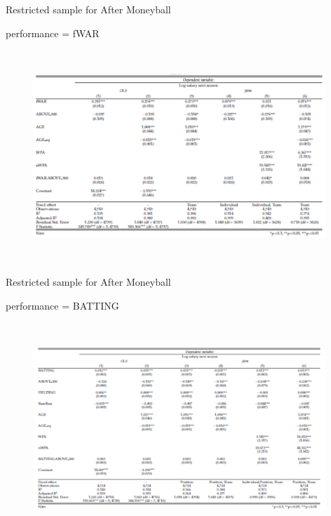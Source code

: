 \documentclass[dvipdfmx,12pt]{beamer}
\begin{document}
\begin{frame}
  \scriptsize
  Restricted sample for After Moneyball

  performance = fWAR

  \begin{figure}
    \includegraphics[width = 11cm, height = 8cm]{fig_tab/mt_tab5_0.pdf}
\label{}
  \end{figure}
\end{frame}

\begin{frame}
  \scriptsize
  Restricted sample for After Moneyball

  performance = BATTING

  \begin{figure}
    \includegraphics[width = 11cm, height = 8cm]{fig_tab/mt_tab5.pdf}
\label{}
  \end{figure}
\end{frame}
\end{document}
